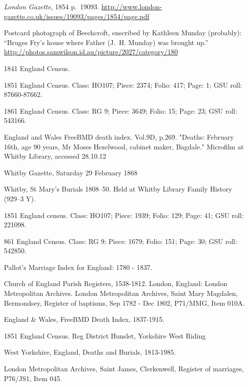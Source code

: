 \begin{thebibliography}{99}
	\emph{London Gazette}, 1854 p.~19093.
	\url{http://www.london-gazette.co.uk/issues/19093/pages/1854/page.pdf}

	Postcard photograph of Beechcroft,
	enscribed by Kathleen Munday (probably):
	``Bruges Fry's house where Father (J.~H. Munday) was brought up.''
	\url{http://photos.samwilson.id.au/picture/2027/category/180}

	1841 England Census. 
	
	1851 England Census. Class: HO107; Piece: 2374; Folio: 417; Page: 1; GSU roll: 87660-87662.
	
	1861 England Census. Class: RG 9; Piece: 3649; Folio: 15; Page: 23; GSU roll: 543166.
	
	England and Wales FreeBMD death index. Vol.9D, p.269. 
	"Deaths: February 16th, age 90 years, Mr Moses Hezelwood, cabinet maker, Bagdale." Microfilm at Whitby 			Library, accessed 28.10.12
	
	Whitby Gazette, Saturday 29 February 1868
	
	Whitby, St Mary's Burials 1808--50. Held at Whitby Library Family History (929--3 Y).

	 1851 England census. Class: HO107; Piece: 1939; Folio: 129; Page: 41; GSU roll: 221098.
	 
	861 England Census. Class: RG 9; Piece: 1679; Folio: 151; Page: 30; GSU roll: 542850.
	
	 Pallot's Marriage Index for England: 1780 - 1837.
	 
	Church of England Parish Registers, 1538-1812. London, England: London Metropolitan Archives.
	London Metropolitan Archives, Saint Mary Magdalen, Bermondsey, Register of baptisms, Sep 1782 - Dec 1802, 		P71/MMG, Item 010A.
	
	England \& Wales, FreeBMD Death Index, 1837-1915. 
	
	1851 England Census. Reg District Hunslet, Yorkshire West Riding
	
	West Yorkshire, England, Deaths and Burials, 1813-1985. 
	
	London Metropolitan Archives, Saint James, Clerkenwell, Register of marriages, P76/JS1, Item 045. 
	

\end{thebibliography}
